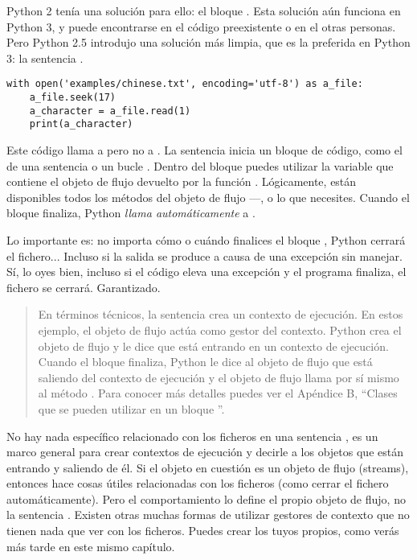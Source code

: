 Python 2 tenía una solución para ello: el bloque . Esta solución aún funciona en Python 3, y puede encontrarse en el código preexistente o en el otras personas. Pero Python 2.5 introdujo una solución más limpia, que es la preferida en Python 3: la sentencia  .

\noindent\begin{minipage}{\textwidth}
\begin{lstlisting}[mathescape=True]
with open('examples/chinese.txt', encoding='utf-8') as a_file:
    a_file.seek(17)
    a_character = a_file.read(1)
    print(a_character)
\end{lstlisting}
\end{minipage}

Este código llama a  pero no a . La sentencia  inicia un bloque de código, como el de una sentencia  o un bucle . Dentro del bloque puedes utilizar la variable  que contiene el objeto de flujo devuelto por la función . Lógicamente, están disponibles todos los métodos del objeto de flujo ---,  o lo que necesites. Cuando el bloque  finaliza, Python \emph{llama automáticamente} a .

Lo importante es: no importa cómo o cuándo finalices el bloque , Python cerrará el fichero... Incluso si la salida se produce a causa de una excepción sin manejar. Sí, lo oyes bien, incluso si el código eleva una excepción y el programa finaliza, el fichero se cerrará. Garantizado.

\begin{quote}
En términos técnicos, la sentencia  crea un contexto de ejecución. En estos ejemplo, el objeto de flujo actúa como gestor del contexto. Python crea el objeto de flujo  y le dice que está entrando en un contexto de ejecución. Cuando el bloque  finaliza, Python le dice al objeto de flujo que está saliendo del contexto de ejecución y el objeto de flujo llama por sí mismo al método . Para conocer más detalles puedes ver el Apéndice B, ``Clases que se pueden utilizar en un bloque ''. 
\end{quote}

No hay nada específico relacionado con los ficheros en una sentencia , es un marco general para crear contextos de ejecución y decirle a los objetos que están entrando y saliendo de él. Si el objeto en cuestión es un objeto de flujo (streams), entonces hace cosas útiles relacionadas con los ficheros (como cerrar el fichero automáticamente). Pero el comportamiento lo define el propio objeto de flujo, no la sentencia . Existen otras muchas formas de utilizar gestores de contexto que no tienen nada que ver con los ficheros. Puedes crear los tuyos propios, como verás más tarde en este mismo capítulo.

